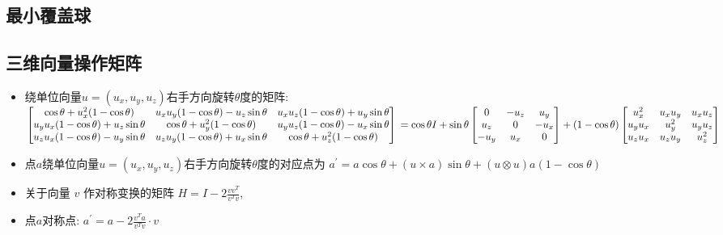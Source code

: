 \documentclass[landscape, twocolumn, 8pt, a4paper, twoside]{extarticle}
\begin{document}
  \subsection{最小覆盖球}
    
  
  \subsection{三维向量操作矩阵}
    \begin{itemize}
    \item 绕单位向量$u = (u_x, u_y, u_z)$右手方向旋转$\theta$度的矩阵: \\
      $
      \begin{bmatrix}
        \cos\theta + u_x^2 (1 - \cos\theta)    &    u_x u_y (1 - \cos\theta) - u_z \sin\theta    &    u_x u_z (1 - \cos\theta) + u_y \sin\theta \\
        u_y u_x (1 - \cos\theta) + u_z \sin\theta    &    \cos\theta + u_y^2 (1 - \cos\theta)    &    u_y u_z (1 - \cos\theta) - u_x \sin\theta \\
        u_z u_x (1 - \cos\theta) - u_y \sin\theta    &    u_z u_y (1 - \cos\theta) + u_x \sin\theta    &    \cos\theta + u_z^2 (1 - \cos\theta)
        \end{bmatrix} \\
      = \cos\theta I
      + \sin\theta
        \begin{bmatrix}
          0    &    -u_z    &    u_y \\
          u_z    &    0    &    -u_x \\
          -u_y    &    u_x    &    0
        \end{bmatrix}
      + (1 - \cos\theta)
        \begin{bmatrix}
        u_x ^ 2    &    u_x u_y    &    u_x u_z \\
        u_y u_x    &    u_y ^ 2    &    u_y u_z \\
        u_z u_x    &    u_z u_y    &    u_z ^ 2
      \end{bmatrix}
      $
    \item 点$a$绕单位向量$u = (u_x, u_y, u_z)$右手方向旋转$\theta$度的对应点为
        $a^\prime = a \cos\theta + (u \times a) \sin\theta + (u \otimes u) a (1 - \cos\theta)$
    \item 关于向量 $v$ 作对称变换的矩阵 $H = I - 2 \frac{v v^T}{v^T v}$,
    \item 点$a$对称点: $a^\prime = a - 2 \frac{v^T a}{v^T v} \cdot v$
    \end{itemize}
\end{document}
